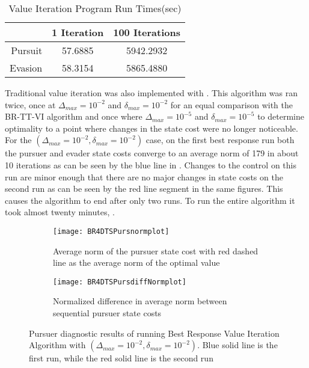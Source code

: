 \begin{table}
\caption{Value Iteration Program Run Times(sec)}
\label{4DVIrt}
\begin{center}
\begin{tabular}{||r|c|c||}\hline
  & 1 Iteration & 100 Iterations \\\hline
Pursuit & 57.6885 & 5942.2932 \\\hline
Evasion & 58.3154 & 5865.4880 \\\hline
\end{tabular}
\end{center}
\end{table}

Traditional value iteration was also implemented with . This algorithm was ran twice, once at $\Delta_{max} = 10^{-2}$ and $\delta_{max} = 10^{-2}$ for an equal comparison with the BR-TT-VI algorithm  and once where $\Delta_{max} = 10^{-5}$ and $\delta_{max} = 10^{-5}$ to determine optimality to a point where changes in the state cost were no longer noticeable. For the $(\Delta_{max} = 10^{-2},\delta_{max} = 10^{-2})$ case, on the first best response run both the pursuer and evader state costs converge to an average norm of 179 in about 10 iterations as can be seen by the blue line in . Changes to the control on this run are minor enough that there are no major changes in state costs on the second run as can be seen by the red line segment in the same figures. This causes the algorithm to end after only two runs. To run the entire algorithm it took almost twenty minutes, . 
\begin{figure}[h!]
\centering
\begin{subfigure}[t]{0.475\textwidth}
	\centering
	\texttt{[image: BR4DTSPursnormplot]}
	\caption{Average norm of the pursuer state cost with red dashed line as the average norm of the optimal value}
	\label{BR4DTSPnp}
\end{subfigure}
\hfill
\begin{subfigure}[t]{0.475\textwidth}
	\centering
	\texttt{[image: BR4DTSPursdiffNormplot]}
	\caption{Normalized difference in average norm between sequential pursuer state costs}
	\label{BR4DTSPdnp}
\end{subfigure}
\caption{Pursuer diagnostic results of running Best Response Value Iteration Algorithm with $(\Delta_{max} = 10^{-2},\delta_{max} = 10^{-2})$. Blue solid line is the first run, while the red solid line is the second run}
\label{BR4DTSPdiag}
\end{figure}
